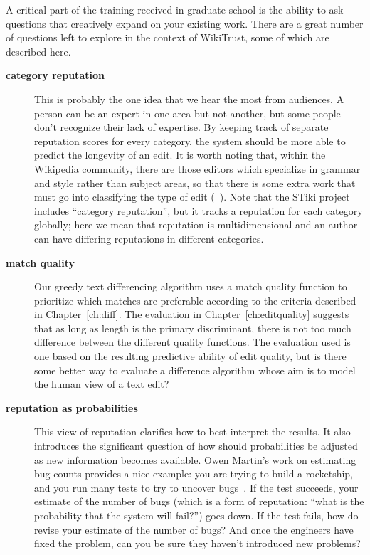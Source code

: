 A critical part of the training received in graduate school
is the ability to ask questions that creatively expand on your
existing work.
There are a great number of questions left to explore in the
context of WikiTrust, some of which are described here.

\begin{description}
\item[\textbf{category reputation}]
    This is probably the one idea that we hear the most from audiences.
    A person can be
    an expert in one area but not another, but some people don't
    recognize their lack of expertise.
    By keeping track of separate reputation scores for every category,
    the system should be more able to predict the longevity of an edit.
    It is worth noting that, within the Wikipedia community, there
    are those editors which specialize in grammar and style rather than
    subject areas, so that there is some extra work that must go
    into classifying the type of edit (\eg~\cite{Fong2010}).
    Note that the STiki project~\cite{West2010} includes ``category
    reputation'', but it tracks a reputation for each category globally;
    here we mean that reputation is multidimensional and an author can
    have differing reputations in different categories.

\item[\textbf{match quality}] Our greedy text differencing algorithm
    uses a match quality function to prioritize which matches are
    preferable according to the criteria described in Chapter~\ref{ch:diff}.
    The evaluation in Chapter~\ref{ch:editquality}
    suggests that as long as length
    is the primary discriminant, there is not too much difference
    between the different quality functions.
    The evaluation used is one based on the resulting predictive ability
    of edit quality, but is there some better way to evaluate a difference
    algorithm whose aim is to model the human view of a text edit?

\item[\textbf{reputation as probabilities}]  This view of reputation
    clarifies how to best interpret the results.
    It also introduces the significant question of how should probabilities
    be adjusted as new information becomes available.
    Owen Martin's work on estimating bug counts provides a nice example:
    you are trying to build a rocketship, and you run many
    tests to try to uncover bugs~\cite{Martin2011}.
    If the test succeeds, your estimate
    of the number of bugs (which is a form of reputation: ``what is
    the probability that the system will fail?'') goes down.
    If the test fails, how do revise your estimate of the number
    of bugs?  And once the engineers have fixed the problem, can
    you be sure they haven't introduced new problems?


\end{description}
